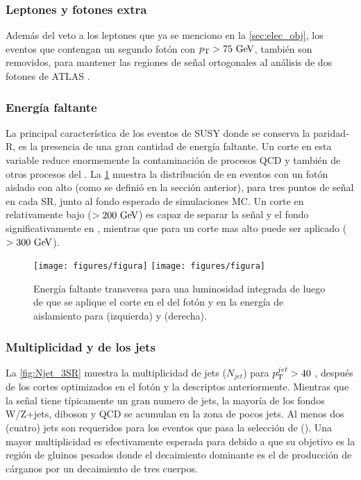 \subsubsection{Leptones y fotones extra}\label{sec:leptonphoton_veto}

Además del veto a los leptones que ya se menciono en la \cref{sec:elec_obj},
los eventos que contengan un segundo fotón con $\pt>75 \gev$, también
son removidos, para mantener las regiones de señal ortogonales al análisis
de dos fotones de ATLAS \cite{ATLAS-CONF-2014-001}.

\subsubsection{Energía faltante}

La principal característica de los eventos de SUSY donde se conserva
la paridad-R, es la presencia de una gran cantidad de energía faltante.
Un corte en esta variable reduce enormemente la contaminación de procesos
QCD y también de otros procesos del {\SM}.
La \cref{fig:MET_3SR} muestra la distribución de {\met} en eventos con
un fotón aislado con alto {\pt} (como se definió en la sección anterior),
para tres puntos de señal en cada SR, junto al fondo esperado de simulaciones
MC. Un corte en {\met} relativamente bajo ($> 200 \gev$) es capaz de separar
la señal y el fondo significativamente en {\SRL}, mientras que para {\SRH}
un corte mas alto puede ser aplicado ($>300\gev$).

\begin{figure}[th!]
  \centering
  \texttt{[image: figures/figura]} %
  \texttt{[image: figures/figura]} %
  \caption{Energía faltante transversa para una luminosidad integrada de {\ilumi}
    luego de que se aplique el corte en el {\pt} del fotón y en la energía de aislamiento
    para {\SRL} (izquierda) y {\SRH} (derecha). }
  \label{fig:MET_3SR}
\end{figure}


\subsubsection{Multiplicidad y {\pt} de los jets} \label{sec:opt_njet}

La \cref{fig:Njet_3SR} muestra la multiplicidad de jets ($N_{jet}$) para $p_{\mathrm{T}}^{jet} > 40$ \gev,
después de los cortes optimizados en el fotón y la {\met} descriptos anteriormente.
Mientras que la señal tiene típicamente un gran numero de jets, la mayoría de los
fondos W/Z+jets, diboson y QCD se acumulan en la zona de pocos jets. Al menos
dos (cuatro) jets son requeridos para los eventos que pasa la selección de {\SRL} ({\SRH}).
Una mayor multiplicidad es efectivamente esperada para {\SRL} debido a que su objetivo
es la región de gluinos pesados donde el decaimiento dominante es el de producción de
cárganos por un decaimiento de tres cuerpos.

